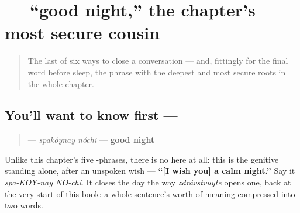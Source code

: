 \section[\texorpdfstring{\ru{спокойной} \ru{ночи} (spakóynay nóchi)}{спокойной ночи (spakóynay nóchi)}]{  — \textquotedblleft{}good night,\textquotedblright{} the chapter's most secure cousin}

\label{lesson:RU-C11-spokoynoy-nochi}



\begin{quote}
The last of six ways to close a conversation — and, fittingly for the final word before sleep, the phrase with the deepest and most secure roots in the whole chapter.
\end{quote}

\subsection*{You'll want to know first —  }
\begin{quote}
\textbf{ } — \emph{spakóynay nóchi} — \textbf{good night}
\end{quote}

Unlike this chapter's five \emph{}-phrases, there is no \emph{} here at all: this is the genitive standing alone, after an unspoken wish — \textbf{\textquotedblleft{}{[}I wish you{]} a calm night.\textquotedblright{}} Say it \emph{spa-KOY-nay NO-chi}. It closes the day the way \emph{zdrávstvuyte} opens one, back at the very start of this book: a whole sentence's worth of meaning compressed into two words.

